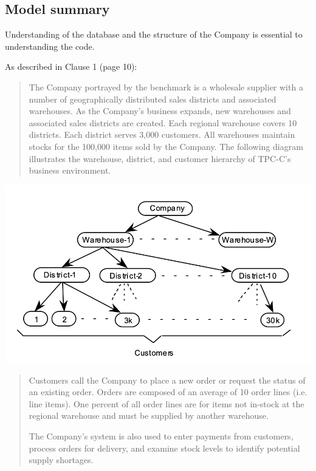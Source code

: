 \subsection{Model summary}

Understanding of the database and the structure of the Company is essential to understanding the code.

As described in Clause 1 (page 10): 

\begin{quotation}
    The Company portrayed by the benchmark is a wholesale supplier with a number of geographically distributed sales districts and associated warehouses. As the Company's business expands, new warehouses and associated sales districts are created. Each regional warehouse covers 10 districts. Each district serves 3,000 customers. All warehouses maintain stocks for the 100,000 items sold by the Company. The following diagram illustrates the warehouse, district, and customer hierarchy of TPC-C's business environment. 
    
\end{quotation}

\includegraphics{img/model.png}
    
\begin{quotation}
    Customers call the Company to place a new order or request the status of an existing order. Orders are composed of an average of 10 order lines (i.e. line items). One percent of all order lines are for items not in-stock at the regional warehouse and must be supplied by another warehouse. 

    The Company's system is also used to enter payments from customers, process orders for delivery, and examine stock levels to identify potential supply shortages.
\end{quotation}

